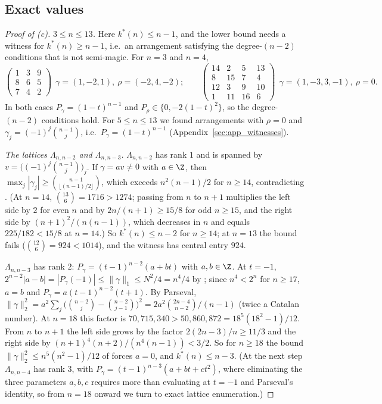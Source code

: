 \subsection{Exact values}
\label{sec:kstar_exact}

\begin{proof}[Proof of (c)]
\emph{$3\le n\le13$.}  Here $k^*(n)\le n-1$, and the lower bound needs a witness for $k^*(n)\ge n-1$, i.e.\ an arrangement satisfying the degree-$(n-2)$ conditions that is not semi-magic.  For $n=3$ and $n=4$,
\[
\begin{pmatrix}1&3&9\\8&6&5\\7&4&2\end{pmatrix}\ \ \gamma=(1,-2,1),\ \rho=(-2,4,-2);\qquad
\begin{pmatrix}14&2&5&13\\8&15&7&4\\12&3&9&10\\1&11&16&6\end{pmatrix}\ \ \gamma=(1,-3,3,-1),\ \rho=0.
\]
In both cases $P_\gamma=(1-t)^{n-1}$ and $P_\rho\in\{0,-2(1-t)^2\}$, so the degree-$(n-2)$ conditions hold.
For $5\le n\le13$ we found arrangements with $\rho=0$ and $\gamma_j=(-1)^j\binom{n-1}j$, i.e.\ $P_\gamma=(1-t)^{n-1}$ (Appendix~\ref{sec:app_witnesses}).

\emph{The lattices $\Lambda_{n,n-2}$ and $\Lambda_{n,n-3}$.}  $\Lambda_{n,n-2}$ has rank $1$ and is spanned by $v=\bigl((-1)^j\binom{n-1}j\bigr)_j$.  If $\gamma=av\ne0$ with $a\in\Z$, then $\max_j|\gamma_j|\ge\binom{n-1}{\lfloor(n-1)/2\rfloor}$, which exceeds $n^2(n-1)/2$ for $n\ge14$, contradicting .
(At $n=14$, $\binom{13}6=1716>1274$; passing from $n$ to $n+1$ multiplies the left side by $2$ for even $n$ and by $2n/(n+1)\ge15/8$ for odd $n\ge15$, and the right side by $(n+1)^2/(n(n-1))$, which decreases in $n$ and equals $225/182<15/8$ at $n=14$.)
So $k^*(n)\le n-2$ for $n\ge14$; at $n=13$ the bound fails ($\binom{12}6=924<1014$), and the witness has central entry $924$.

$\Lambda_{n,n-3}$ has rank $2$: $P_\gamma=(t-1)^{n-2}(a+bt)$ with $a,b\in\Z$.
At $t=-1$, $2^{n-2}|a-b|=|P_\gamma(-1)|\le\|\gamma\|_1\le N^2/4=n^4/4$ by ; since $n^4<2^n$ for $n\ge17$, $a=b$ and $P_\gamma=a(t-1)^{n-2}(t+1)$.
By Parseval, $\|\gamma\|_2^2=a^2\sum_j\bigl(\binom{n-2}j-\binom{n-2}{j-1}\bigr)^2=2a^2\binom{2n-4}{n-2}/(n-1)$ (twice a Catalan number).
At $n=18$ this factor is $70{,}715{,}340>50{,}860{,}872=18^5(18^2-1)/12$.
From $n$ to $n+1$ the left side grows by the factor $2(2n-3)/n\ge11/3$ and the right side by $(n+1)^4(n+2)/(n^4(n-1))<3/2$.
So for $n\ge18$ the bound $\|\gamma\|_2^2\le n^5(n^2-1)/12$ of  forces $a=0$, and $k^*(n)\le n-3$.
(At the next step $\Lambda_{n,n-4}$ has rank $3$, with $P_\gamma=(t-1)^{n-3}(a+bt+ct^2)$, where eliminating the three parameters $a,b,c$ requires more than evaluating at $t=-1$ and Parseval's identity, so from $n=18$ onward we turn to exact lattice enumeration.)


\end{proof}

